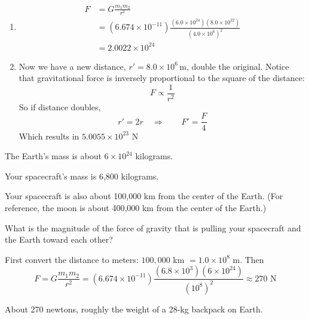 \begin{Answer}[ref=moon_and_planet]
  \begin{enumerate}[label=(\alph*)]
    \item
          \begin{align*}
            F & = G\frac{m_1 m_2}{r^2}                                                                         \\
              & = (6.674 \times 10^{-11})\frac{(6.0 \times 10^{24}) (8.0 \times 10^{22})}{(4.0 \times 10^6)^2} \\
              & = 2.0022 \times 10^{24}
          \end{align*}

    \item Now we have a new distance, $r' = 8.0 \times 10^{6} \, \text{m}$, double the original. Notice that gravitational force is inversely proportional to the square of the distance:
          $$F \propto \frac{1}{r^2}$$
          So if distance doubles,
          $$r' = 2r \quad \Rightarrow \qquad F' = \frac{F}{4}$$
          Which results in $5.0055 \times 10^{23} \text{ N}$
  \end{enumerate}
\end{Answer}


\begin{Exercise}[title={Gravity}, label=gravity_earth]

  The Earth's mass is about $6 \times 10^{24}$ kilograms.

  Your spacecraft's mass is 6,800 kilograms.

  Your spacecraft is also about 100,000 km from the center of the Earth. (For
  reference, the moon is about 400,000 km from the center of the Earth.)

  What is the magnitude of the force of gravity that is pulling your spacecraft and the Earth
  toward each other?

\end{Exercise}
\begin{Answer}[ref=gravity_earth]

  First convert the distance to meters: $100{,}000$ km $= 1.0 \times 10^8$ m. Then
  $$F = G\frac{m_1 m_2}{r^2} = (6.674 \times 10^{-11})\frac{(6.8 \times 10^3)(6
      \times 10^{24})}{(10^8)^2} \approx 270 \text{ N}$$

  About 270 newtons, roughly the weight of a 28-kg backpack on Earth.

\end{Answer}


